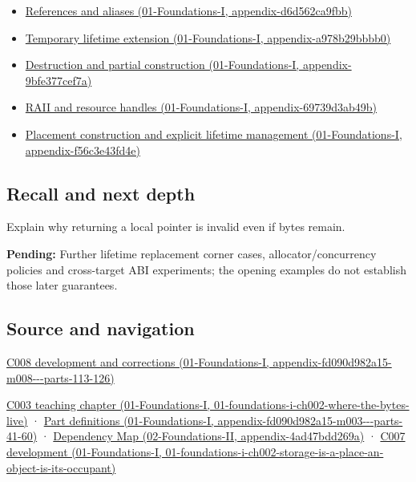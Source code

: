 \begin{itemize}
\item
  \href{../01-Foundations-I/main.pdf\#nameddest=appendix-d6d562ca9fbb}{References and aliases (01-Foundations-I, appendix-d6d562ca9fbb)}
\item
  \href{../01-Foundations-I/main.pdf\#nameddest=appendix-a978b29bbbb0}{Temporary lifetime extension (01-Foundations-I, appendix-a978b29bbbb0)}
\item
  \href{../01-Foundations-I/main.pdf\#nameddest=appendix-9bfe377cef7a}{Destruction and partial construction (01-Foundations-I, appendix-9bfe377cef7a)}
\item
  \href{../01-Foundations-I/main.pdf\#nameddest=appendix-69739d3ab49b}{RAII and resource handles (01-Foundations-I, appendix-69739d3ab49b)}
\item
  \href{../01-Foundations-I/main.pdf\#nameddest=appendix-f56c3e43fd4e}{Placement construction and explicit lifetime management (01-Foundations-I, appendix-f56c3e43fd4e)}
\end{itemize}

\subsection{Recall and next depth}\label{appendix-0b104bcba06b-recall-and-next-depth}

Explain why returning a local pointer is invalid even if bytes remain.

\textbf{Pending:} Further lifetime replacement corner cases, allocator/concurrency policies and cross-target ABI experiments; the opening examples do not establish those later guarantees.

\subsection{Source and navigation}\label{appendix-0b104bcba06b-source-and-navigation}

\href{../01-Foundations-I/main.pdf\#nameddest=appendix-fd090d982a15-m008---parts-113-126}{C008 development and corrections (01-Foundations-I, appendix-fd090d982a15-m008-\/-\/-parts-113-126)}

\href{../01-Foundations-I/main.pdf\#nameddest=01-foundations-i-ch002-where-the-bytes-live}{C003 teaching chapter (01-Foundations-I, 01-foundations-i-ch002-where-the-bytes-live)} · \href{../01-Foundations-I/main.pdf\#nameddest=appendix-fd090d982a15-m003---parts-41-60}{Part definitions (01-Foundations-I, appendix-fd090d982a15-m003-\/-\/-parts-41-60)} · \href{../02-Foundations-II/main.pdf\#nameddest=appendix-4ad47bdd269a}{Dependency Map (02-Foundations-II, appendix-4ad47bdd269a)} · \href{../01-Foundations-I/main.pdf\#nameddest=01-foundations-i-ch002-storage-is-a-place-an-object-is-its-occupant}{C007 development (01-Foundations-I, 01-foundations-i-ch002-storage-is-a-place-an-object-is-its-occupant)}
